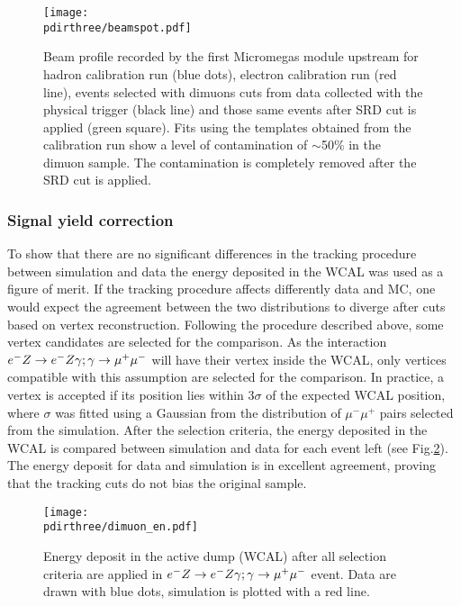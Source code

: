 \begin{figure}[tbh!]
  \centering
    \texttt{[image: \\pdirthree/beamspot.pdf]}
  \caption[Beam profile with different cuts]{Beam profile recorded by the first Micromegas module upstream for hadron calibration run (blue dots), electron calibration run (red line), events selected with dimuons cuts from data collected with the physical trigger (black line) and those same events after SRD cut is applied (green square). Fits using the templates obtained from the calibration run show a level of contamination of $\sim$50\% in the dimuon sample. The contamination is completely removed after the SRD cut is applied.}
  \label{fig:dimuon:profile}
\end{figure}


\subsubsection{Signal yield correction}
\label{ch3:sec:dimuons-sig-corr}

To show that there are no significant differences in the tracking procedure between simulation and data the energy deposited in the WCAL was used as a figure of merit. If the tracking procedure affects differently data and MC, one would expect the agreement between the two distributions to diverge after cuts based on vertex reconstruction. Following the procedure described above, some vertex candidates are selected for the comparison. As the interaction $\emu$ will have their vertex inside the WCAL, only vertices compatible with this assumption are selected for the comparison. In practice, a vertex is accepted if its position lies within 3$\sigma$ of the expected WCAL position, where $\sigma$ was fitted using a Gaussian from the distribution of $\mu^- \mu^+$ pairs selected from the simulation. After the selection criteria, the energy deposited in the WCAL is compared between simulation and data for each event left (see Fig.\ref{fig:dimuon_en}). The energy deposit for data and simulation is in excellent agreement, proving that the tracking cuts do not bias the original sample.

\begin{figure}[tbh!]
  \centering
    \texttt{[image: \\pdirthree/dimuon\_en.pdf]}
  \caption[$\emu$ MC-DATA comparison in visible mode]{Energy deposit in the active dump (WCAL) after all selection criteria are applied in $\emu$ event. Data are drawn with blue dots, simulation is plotted with a red line.}
  \label{fig:dimuon_en}
\end{figure}

